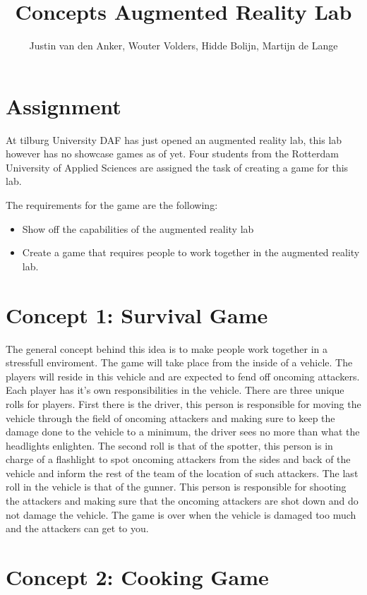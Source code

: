 \documentclass[10pt,a4paper]{article}
\author{Justin van den Anker, Wouter Volders, Hidde Bolijn, Martijn de Lange}
\title{Concepts Augmented Reality Lab}
\begin{document}
\maketitle
\section{Assignment}
At tilburg University DAF has just opened an augmented reality lab, this lab however has no showcase games as of yet. Four students from the Rotterdam University of Applied Sciences are assigned the task of creating a game for this lab. 

The requirements for the game are the following:
\begin{itemize}
\item Show off the capabilities of the augmented reality lab
\item Create a game that requires people to work together in the augmented reality lab.
\end{itemize}

\section{Concept 1: Survival Game}
The general concept behind this idea is to make people work together in a stressfull enviroment. The game will take place from the inside of a vehicle. The players will reside in this vehicle and are expected to fend off oncoming attackers. Each player has it's own responsibilities in the vehicle. There are three unique rolls for players. First there is the driver, this person is responsible for moving the vehicle through the field of oncoming attackers and making sure to keep the damage done to the vehicle to a minimum, the driver sees no more than what the headlights enlighten. The second roll is that of the spotter, this person is in charge of a flashlight to spot oncoming attackers from the sides and back of the vehicle and inform the rest of the team of the location of such attackers. The last roll in the vehicle is that of the gunner. This person is responsible for shooting the attackers and making sure that the oncoming attackers are shot down and do not damage the vehicle. The game is over when the vehicle is damaged too much and the attackers can get to you. 

\section{Concept 2: Cooking Game}
\end{document}
